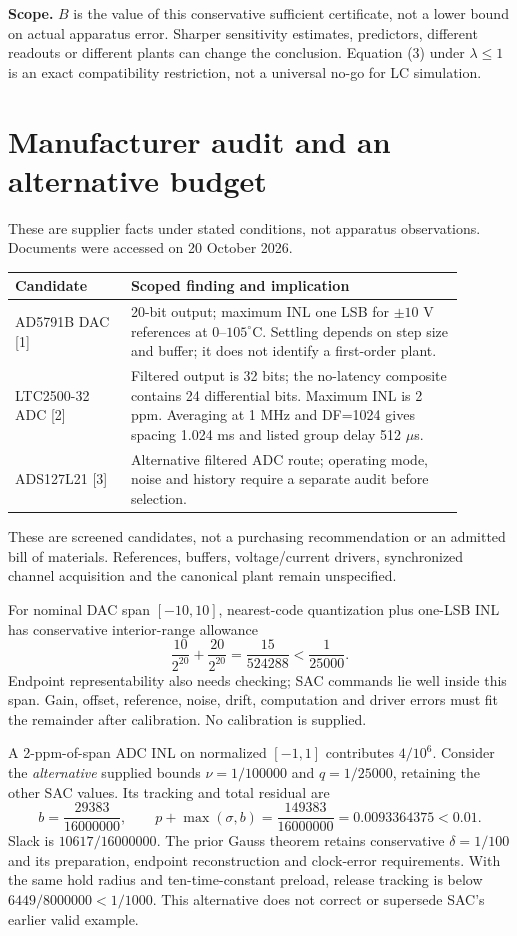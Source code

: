 \documentclass[10pt,a4paper]{article}
\begin{document}
\textbf{Scope.} $B$ is the value of this conservative sufficient certificate, not a lower bound on actual apparatus error. Sharper sensitivity estimates, predictors, different readouts or different plants can change the conclusion. Equation (3) under $\lambda\leq1$ is an exact compatibility restriction, not a universal no-go for LC simulation.
\newpage
\section{Manufacturer audit and an alternative budget}
These are supplier facts under stated conditions, not apparatus observations. Documents were accessed on 20 October 2026.
\begin{center}
\begin{tabular}{p{0.23\linewidth}p{0.66\linewidth}}
\toprule
Candidate & Scoped finding and implication\\
\midrule
AD5791B DAC [1] & 20-bit output; maximum INL one LSB for $\pm10$ V references at $0$--$105^\circ$C. Settling depends on step size and buffer; it does not identify a first-order plant.\\
LTC2500-32 ADC [2] & Filtered output is 32 bits; the no-latency composite contains 24 differential bits. Maximum INL is 2 ppm. Averaging at 1 MHz and DF=1024 gives spacing 1.024 ms and listed group delay 512 $\mu$s.\\
ADS127L21 [3] & Alternative filtered ADC route; operating mode, noise and history require a separate audit before selection.\\
\bottomrule
\end{tabular}
\end{center}
These are screened candidates, not a purchasing recommendation or an admitted bill of materials. References, buffers, voltage/current drivers, synchronized channel acquisition and the canonical plant remain unspecified.

For nominal DAC span $[-10,10]$, nearest-code quantization plus one-LSB INL has conservative interior-range allowance
\begin{equation}
\frac{10}{2^{20}}+\frac{20}{2^{20}}
=\frac{15}{524288}<\frac1{25000}.
\end{equation}
Endpoint representability also needs checking; SAC commands lie well inside this span. Gain, offset, reference, noise, drift, computation and driver errors must fit the remainder after calibration. No calibration is supplied.

A 2-ppm-of-span ADC INL on normalized $[-1,1]$ contributes $4/10^6$. Consider the \emph{alternative} supplied bounds $\nu=1/100000$ and $q=1/25000$, retaining the other SAC values. Its tracking and total residual are
\begin{equation}
b=\frac{29383}{16000000},\qquad
p+\max(\sigma,b)=\frac{149383}{16000000}
=0.0093364375<0.01 .
\end{equation}
Slack is $10617/16000000$. The prior Gauss theorem retains conservative $\delta=1/100$ and its preparation, endpoint reconstruction and clock-error requirements. With the same hold radius and ten-time-constant preload, release tracking is below $6449/8000000<1/1000$. This alternative does not correct or supersede SAC's earlier valid example.
\end{document}
